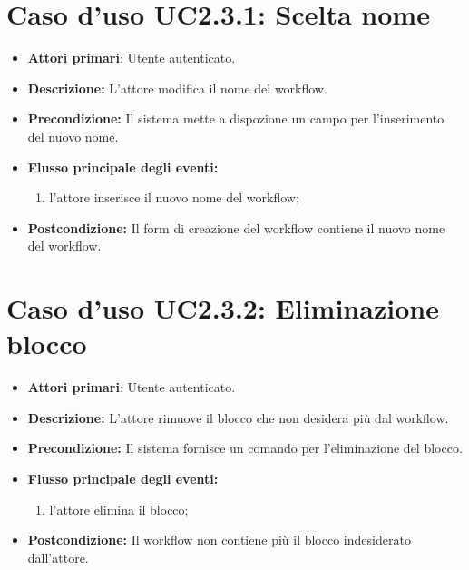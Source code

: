 		\section{Caso d'uso UC2.3.1: Scelta nome }
		\begin{itemize}
			\item \textbf{Attori primari}: Utente autenticato.
			\item \textbf{Descrizione:} L'attore modifica il nome del workflow.
			\item \textbf{Precondizione:} Il sistema mette a dispozione un campo per l'inserimento del nuovo nome.
			\item \textbf{Flusso principale degli eventi:}
			\begin{enumerate}
				\item l'attore inserisce il nuovo nome del workflow;
			\end{enumerate}
			\item \textbf{Postcondizione:} Il form di creazione del workflow contiene il nuovo nome del workflow.
		\end{itemize}
		\section{Caso d'uso UC2.3.2: Eliminazione blocco }
		\begin{itemize}
			\item \textbf{Attori primari}: Utente autenticato.
			\item \textbf{Descrizione:} L'attore rimuove il blocco che non desidera più dal workflow.
			\item \textbf{Precondizione:} Il sistema fornisce un comando per l'eliminazione del blocco.
			\item \textbf{Flusso principale degli eventi:}
			\begin{enumerate}
				\item l'attore elimina il blocco;
			\end{enumerate}
			\item \textbf{Postcondizione:} Il workflow non contiene più il blocco indesiderato dall'attore.
		\end{itemize}
